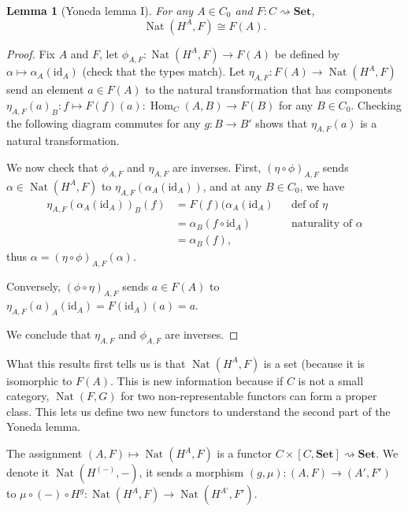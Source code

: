 \documentclass{article}
\newtheorem{lem}[thm]{Lemma}
\theoremstyle{definition}
\theoremstyle{remark}
\DeclareMathOperator{\Hom}{Hom}
\DeclareMathOperator{\Nat}{Nat}
\newcommand{\id}{\text{id}}
\begin{document}
\begin{lem}[Yoneda lemma I]
	For any $A \in C_0$ and $F: C\rightsquigarrow \textbf{Set}$,
	\[\Nat(H^A, F) \cong F(A).\]
\end{lem} 
\begin{proof}
	Fix $A$ and $F$, let $\phi_{A,F}: \Nat(H^A, F) \rightarrow F(A)$ be defined by $\alpha \mapsto \alpha_A(\id_A)$ (check that the types match). Let $\eta_{A,F}: F(A) \rightarrow \Nat(H^A,F)$ send an element $a \in F(A)$ to the natural transformation that has components $\eta_{A,F}(a)_B: f \mapsto F(f)(a): \Hom_C(A,B) \rightarrow F(B)$ for any $B \in C_0$. Checking the following diagram commutes for any $g:B\rightarrow B'$ shows that $\eta_{A,F}(a)$ is a natural transformation.
	\begin{figure}[h]
		\centering
	\end{figure}

	We now check that $\phi_{A,F}$ and $\eta_{A,F}$ are inverses. First,
	$(\eta \circ \phi)_{A,F}$ sends $\alpha\in \Nat(H^A,F)$ to $\eta_{A,F}(\alpha_A(\id_A))$, and at any $B \in C_0$, we have 
	\begin{align*}
		\eta_{A,F}(\alpha_A(\id_A))_B(f) &= F(f)(\alpha_A(\id_A)&&\mbox{def of $\eta$}\\
		&= \alpha_B(f \circ \id_A) &&\mbox{naturality of $\alpha$}\\
		&= \alpha_B(f),
	\end{align*}
	thus $\alpha = (\eta \circ \phi)_{A,F}(\alpha)$.
	
	Conversely, $(\phi\circ \eta)_{A,F}$ sends $a \in F(A)$ to $\eta_{A,F}(a)_A(\id_A) = F(\id_A)(a) = a$.
	
	We conclude that $\eta_{A,F}$ and $\phi_{A,F}$ are inverses.
\end{proof}
What this results first tells us is that $\Nat(H^A, F)$ is a set (because it is isomorphic to $F(A)$. This is new information because if $C$ is not a small category, $\Nat(F,G)$ for two non-representable functors can form a proper class. This lets us define two new functors to understand the second part of the Yoneda lemma.

The assignment $(A,F) \mapsto \Nat(H^A,F)$ is a functor $C \times [C,\textbf{Set}] \rightsquigarrow \textbf{Set}$. We denote it $\Nat(H^{(-)}, -)$, it sends a morphism $(g,\mu): (A,F) \rightarrow (A',F')$ to $\mu \circ (-) \circ H^g:\Nat(H^A,F) \rightarrow \Nat(H^{A'},F')$.
\end{document}

